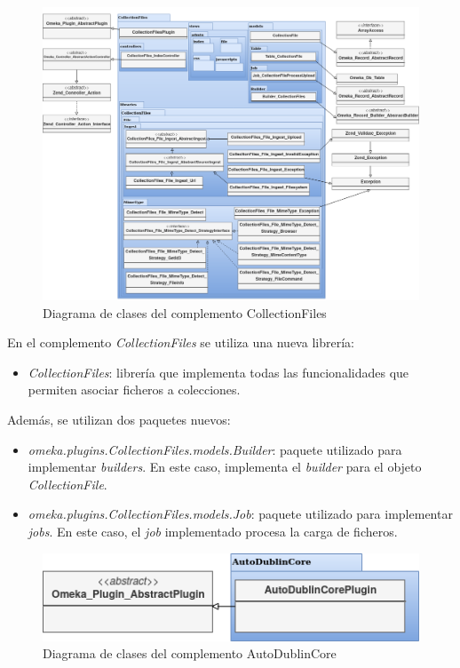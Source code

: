 \documentclass[
]{article}
\providecommand{\tightlist}{%
  \setlength{\itemsep}{0pt}\setlength{\parskip}{0pt}}
\begin{document}
\begin{figure}
\hypertarget{da-pck-8}{%
\centering
\includegraphics{../_static/images/pck-8.png}
\caption{Diagrama de clases del complemento
CollectionFiles}\label{da-pck-8}
}
\end{figure}

En el complemento \emph{CollectionFiles} se utiliza una nueva librería:

\begin{itemize}
\tightlist
\item
  \emph{CollectionFiles}: librería que implementa todas las
  funcionalidades que permiten asociar ficheros a colecciones.
\end{itemize}

Además, se utilizan dos paquetes nuevos:

\begin{itemize}
\tightlist
\item
  \emph{omeka.plugins.CollectionFiles.models.Builder}: paquete utilizado
  para implementar \emph{builders}. En este caso, implementa el
  \emph{builder} para el objeto \emph{CollectionFile}.
\item
  \emph{omeka.plugins.CollectionFiles.models.Job}: paquete utilizado
  para implementar \emph{jobs}. En este caso, el \emph{job} implementado
  procesa la carga de ficheros.
\end{itemize}

\begin{figure}
\hypertarget{da-pck-9}{%
\centering
\includegraphics{../_static/images/pck-9.png}
\caption{Diagrama de clases del complemento
AutoDublinCore}\label{da-pck-9}
}
\end{figure}
\end{document}
